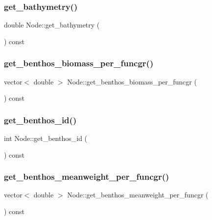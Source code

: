 \mbox{\label{class_node_ae4da934fddf16cecc9251773e6c34f4b}} 
\subsubsection{\texorpdfstring{get\_bathymetry()}{get\_bathymetry()}}
{\footnotesize\ttfamily double Node\+::get\+\_\+bathymetry (\begin{DoxyParamCaption}{ }\end{DoxyParamCaption}) const}

\mbox{\label{class_node_adb37cca7dacc053b545fe64ddde0e648}} 
\subsubsection{\texorpdfstring{get\_benthos\_biomass\_per\_funcgr()}{get\_benthos\_biomass\_per\_funcgr()}}
{\footnotesize\ttfamily vector$<$ double $>$ Node\+::get\+\_\+benthos\+\_\+biomass\+\_\+per\+\_\+funcgr (\begin{DoxyParamCaption}{ }\end{DoxyParamCaption}) const}

\mbox{\label{class_node_a651fc83d1ae98f1432057c527edad389}} 
\subsubsection{\texorpdfstring{get\_benthos\_id()}{get\_benthos\_id()}}
{\footnotesize\ttfamily int Node\+::get\+\_\+benthos\+\_\+id (\begin{DoxyParamCaption}{ }\end{DoxyParamCaption}) const}

\mbox{\label{class_node_a54c3ee3e02f144d28e0430b7ceba33ce}} 
\subsubsection{\texorpdfstring{get\_benthos\_meanweight\_per\_funcgr()}{get\_benthos\_meanweight\_per\_funcgr()}}
{\footnotesize\ttfamily vector$<$ double $>$ Node\+::get\+\_\+benthos\+\_\+meanweight\+\_\+per\+\_\+funcgr (\begin{DoxyParamCaption}{ }\end{DoxyParamCaption}) const}


